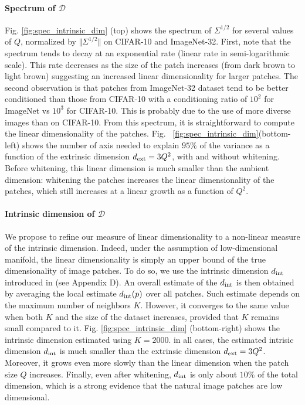 \documentclass{article}
\begin{document}
\paragraph{Spectrum of $\mathcal{D}$}
Fig. \ref{fig:spec_intrinsic_dim} (top) shows the spectrum of $\Sigma^{1/2}$ for  several values of $Q$, normalized by $\Vert \Sigma^{1/2}\Vert$ on CIFAR-10 and ImageNet-32.  First, note that the spectrum tends to decay at an exponential rate (linear rate in semi-logarithmic scale). This rate decreases as the size of the patch increases (from dark brown to light brown) suggesting an increased linear dimensionality for larger patches. The second observation is that patches from ImageNet-32 dataset tend to be better conditioned than those from CIFAR-10 with a conditioning ratio of $10^2$ for ImageNet vs $10^3$ for CIFAR-10. This is probably due to the use of more diverse images than on CIFAR-10. From this spectrum, it is straightforward to compute the linear dimensionality of the patches. Fig.
~\ref{fig:spec_intrinsic_dim}(bottom-left) shows the number of axis needed to explain $95\%$ of the variance as a function of the extrinsic dimension $d_{\rm ext} = 3Q^2$, with and without whitening. Before whitening, this linear dimension is much smaller than the ambient dimension: whitening the patches increases the linear dimensionality of the patches, which still increases at a linear growth as a function of $Q^2$.

\vspace{-0.3cm}
\paragraph{Intrinsic dimension of $\mathcal{D}$}
We propose to refine our measure of linear dimensionality to a non-linear measure of the intrinsic dimension. Indeed, under the assumption of low-dimensional manifold, the linear dimensionality is simply an upper bound of the true dimensionality of image patches.
To do so, we use the intrinsic dimension $d_{\rm int}$ introduced in \citep{Levina:2004} (see Appendix D).  
An overall estimate of the $d_{\rm int}$ is then obtained by averaging the local estimate $d_{\rm int}(p)$ over all patches. Such estimate depends on the maximum number of neighbors $K$. However, it converges to the same value when both $K$ and the size of the dataset  increases, provided that $K$ remains small compared to it. Fig. \ref{fig:spec_intrinsic_dim} (bottom-right) shows the intrinsic dimension estimated using $K=2000$.
in all cases, the estimated intrisic dimension $d_{\rm int}$ is much smaller than the extrinsic dimension $d_{\rm ext}=3Q^2$.
Moreover, it grows even more slowly than the linear dimension when the patch size $Q$ increases. Finally, even after whitening, $d_{\rm int}$ is only about $10\%$ of the total dimension, which is a strong evidence that the natural image patches are low dimensional.
\end{document}
